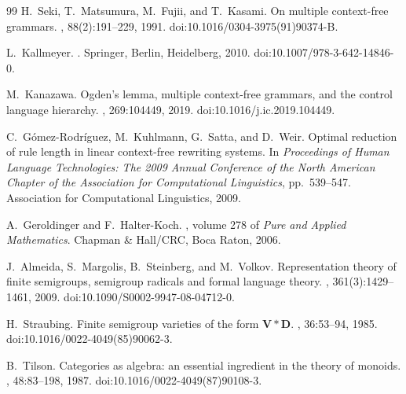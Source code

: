 \documentclass[11pt,a4paper]{ltjsarticle}
\numberwithin{equation}{section}
\theoremstyle{plain}
\theoremstyle{definition}
\theoremstyle{remark}
\begin{document}
\begin{thebibliography}{99}
H.~Seki, T.~Matsumura, M.~Fujii, and T.~Kasami.
\newblock On multiple context-free grammars.
, 88(2):191--229, 1991.
\newblock doi:10.1016/0304-3975(91)90374-B.

L.~Kallmeyer.
.
\newblock Springer, Berlin, Heidelberg, 2010.
\newblock doi:10.1007/978-3-642-14846-0.

M.~Kanazawa.
\newblock Ogden's lemma, multiple context-free grammars, and the control language hierarchy.
, 269:104449, 2019.
\newblock doi:10.1016/j.ic.2019.104449.

C.~G\'omez-Rodr\'iguez, M.~Kuhlmann, G.~Satta, and D.~Weir.
\newblock Optimal reduction of rule length in linear context-free rewriting systems.
\newblock In {\em Proceedings of Human Language Technologies: The 2009 Annual
Conference of the North American Chapter of the Association for Computational
Linguistics}, pp.~539--547. Association for Computational Linguistics, 2009.

A.~Geroldinger and F.~Halter-Koch.
, volume 278 of {\em Pure and Applied Mathematics}.
\newblock Chapman \& Hall/CRC, Boca Raton, 2006.

J.~Almeida, S.~Margolis, B.~Steinberg, and M.~Volkov.
\newblock Representation theory of finite semigroups, semigroup radicals and
formal language theory.
,
361(3):1429--1461, 2009.
\newblock doi:10.1090/S0002-9947-08-04712-0.

H.~Straubing.
\newblock Finite semigroup varieties of the form $\mathbf V*\mathbf D$.
, 36:53--94, 1985.
\newblock doi:10.1016/0022-4049(85)90062-3.

B.~Tilson.
\newblock Categories as algebra: an essential ingredient in the theory of monoids.
, 48:83--198, 1987.
\newblock doi:10.1016/0022-4049(87)90108-3.

\end{thebibliography}
\normalsize
\end{document}
